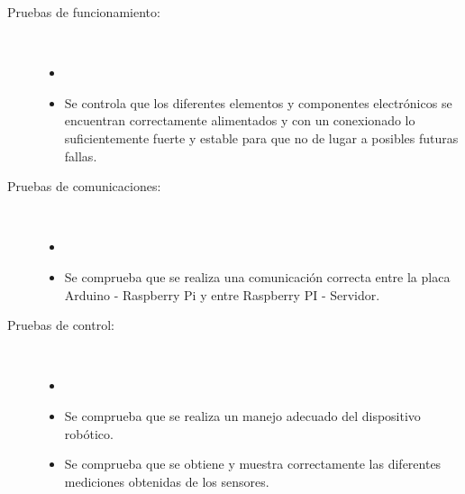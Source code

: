 \begin{description} 

\item [Pruebas de funcionamiento:]\\

\begin{itemize}
    \item[]
 \item Se controla que los diferentes elementos y componentes electrónicos se encuentran correctamente alimentados y con un conexionado lo suficientemente fuerte y estable 
 para que no de lugar a posibles futuras fallas.
\end{itemize}


\item [Pruebas de comunicaciones:]\\

\begin{itemize}
    \item[]
 \item Se comprueba que se realiza una comunicación correcta entre la placa Arduino - Raspberry Pi y entre Raspberry PI - Servidor.
\end{itemize}


\item [Pruebas de control:] \\

\begin{itemize}
    \item[]
 \item Se comprueba que se realiza un manejo adecuado del dispositivo robótico.
 \item Se comprueba que se obtiene y muestra correctamente las diferentes mediciones obtenidas de los sensores.
\end{itemize}

\end{description}